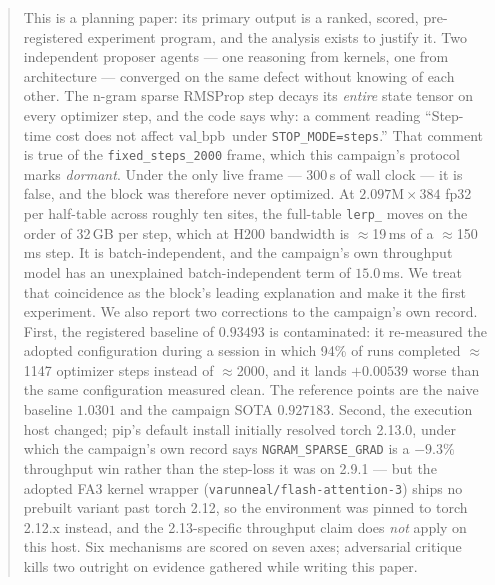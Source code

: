 \documentclass{article}
\newcommand{\vb}{\mathrm{val\_bpb}}
\begin{document}
\printAffiliationsAndNotice{}

\begin{abstract}
This is a planning paper: its primary output is a ranked, scored, pre-registered experiment program, and the analysis exists to justify it. Two independent proposer agents --- one reasoning from kernels, one from architecture --- converged on the same defect without knowing of each other. The n-gram sparse RMSProp step decays its \emph{entire} state tensor on every optimizer step, and the code says why: a comment reading ``Step-time cost does not affect $\vb$\ under \texttt{STOP\_MODE=steps}.'' That comment is true of the \texttt{fixed\_steps\_2000} frame, which this campaign's protocol marks \emph{dormant}. Under the only live frame --- 300\,s of wall clock --- it is false, and the block was therefore never optimized. At $2.097\mathrm{M}\times384$ fp32 per half-table across roughly ten sites, the full-table \texttt{lerp\_} moves on the order of 32\,GB per step, which at H200 bandwidth is $\approx$19\,ms of a $\approx$150\,ms step. It is batch-independent, and the campaign's own throughput model has an unexplained batch-independent term of $15.0$\,ms. We treat that coincidence as the block's leading explanation and make it the first experiment. We also report two corrections to the campaign's own record. First, the registered baseline of $0.93493$ is contaminated: it re-measured the adopted configuration during a session in which 94\% of runs completed $\approx$1147 optimizer steps instead of $\approx$2000, and it lands $+0.00539$ worse than the same configuration measured clean. The reference points are the naive baseline $1.0301$ and the campaign SOTA $0.927183$. Second, the execution host changed; pip's default install initially resolved torch 2.13.0, under which the campaign's own record says \texttt{NGRAM\_SPARSE\_GRAD} is a $-9.3\%$ throughput win rather than the step-loss it was on 2.9.1 --- but the adopted FA3 kernel wrapper (\texttt{varunneal/flash-attention-3}) ships no prebuilt variant past torch 2.12, so the environment was pinned to torch 2.12.x instead, and the 2.13-specific throughput claim does \emph{not} apply on this host. Six mechanisms are scored on seven axes; adversarial critique kills two outright on evidence gathered while writing this paper.
\end{abstract}
\end{document}
